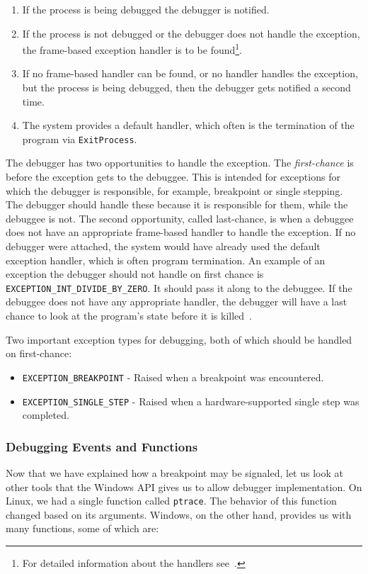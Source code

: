 \begin{enumerate}
    \item If the process is being debugged the debugger is notified.
    \item If the process is not debugged or the debugger does not handle the
        exception, the frame-based exception handler is to be
        found\footnote{For detailed information about the handlers
        see~\cite{windows-msdn-seh}.}.
    \item If no frame-based handler can be found, or no handler handles the
        exception, but the process is being debugged, then the debugger gets
        notified a second time.
    \item The system provides a default handler, which often is the termination of
        the program via \texttt{ExitProcess}.
\end{enumerate}
The debugger has two opportunities to handle the exception. The
\textit{first-chance} is before the exception gets to the debuggee. This is
intended for exceptions for which the debugger is responsible, for example,
breakpoint or single stepping. The debugger should handle these because it is
responsible for them, while the debuggee is not. The second opportunity, called
last-chance, is when a debuggee does not have an appropriate frame-based
handler to handle the exception. If no debugger were attached, the system would
have already used the default exception handler, which is often program
termination. An example of an exception the debugger should not handle on first
chance is \verb|EXCEPTION_INT_DIVIDE_BY_ZERO|. It should pass it along to the
debuggee. If the debuggee does not have any appropriate handler, the debugger
will have a last chance to look at the program's state before it is
killed~\cite{windows-msdn-dbg-exc-handling}.

Two important exception types for debugging, both of which should be handled on
first-chance:
\begin{itemize}
    \item \texttt{EXCEPTION\_BREAKPOINT} - Raised when a breakpoint was encountered.
    \item \texttt{EXCEPTION\_SINGLE\_STEP} - Raised when a hardware-supported
        single step was completed.
\end{itemize}

\subsubsection*{Debugging Events and Functions}
Now that we have explained how a breakpoint may be signaled, let us look at
other tools that the Windows API gives us to allow debugger implementation. On
Linux, we had a single function called \texttt{ptrace}. The behavior of this
function changed based on its arguments. Windows, on the other hand, provides
us with many functions, some of which are:


